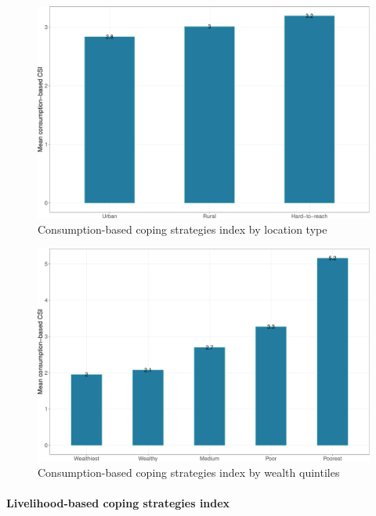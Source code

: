 \documentclass[12pt,a4paper]{article}
\let\oldparagraph\paragraph
\renewcommand{\paragraph}[1]{\oldparagraph{#1}\mbox{}}
\begin{document}
\newpage

\begin{figure}[H]

{\centering \includegraphics{kayahReport_files/figure-latex/ccsi1plot-1} 

}

\caption{Consumption-based coping strategies index by location type}\label{fig:ccsi1plot}
\end{figure}

\begin{figure}[H]

{\centering \includegraphics{kayahReport_files/figure-latex/ccsi2plot-1} 

}

\caption{Consumption-based coping strategies index by wealth quintiles}\label{fig:ccsi2plot}
\end{figure}

\hypertarget{lcsi-results}{%
\paragraph{Livelihood-based coping strategies index}\label{lcsi-results}}
\end{document}
